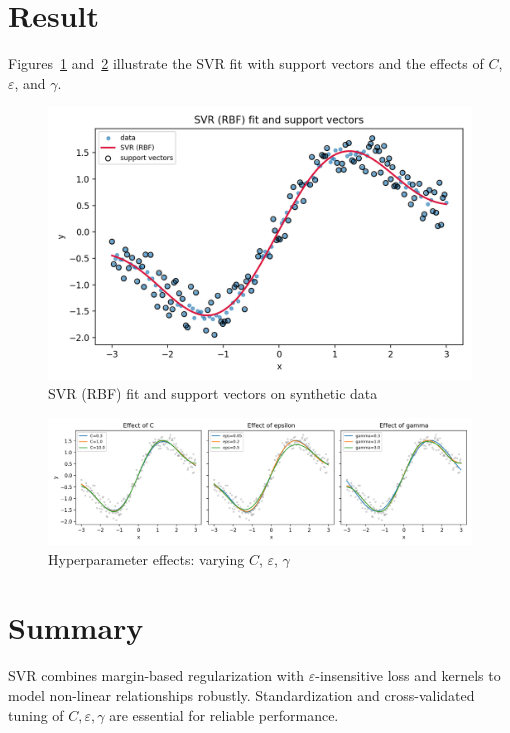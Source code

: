 \documentclass{article}
\begin{document}
\section{Result}
Figures~\ref{fig:svr_rbf_fit} and~\ref{fig:svr_params} illustrate the SVR fit with support vectors and the effects of \(C\), \(\varepsilon\), and \(\gamma\).

\begin{figure}[H]
  \centering
  \includegraphics[width=0.85\linewidth]{svr_rbf_fit.png}
  \caption{SVR (RBF) fit and support vectors on synthetic data}
  \label{fig:svr_rbf_fit}
\end{figure}

\begin{figure}[H]
  \centering
  \includegraphics[width=0.95\linewidth]{svr_params_effect.png}
  \caption{Hyperparameter effects: varying \(C\), \(\varepsilon\), \(\gamma\)}
  \label{fig:svr_params}
\end{figure}

\FloatBarrier

\section{Summary}
SVR combines margin-based regularization with \(\varepsilon\)-insensitive loss and kernels to model non-linear relationships robustly. Standardization and cross-validated tuning of \(C,\varepsilon,\gamma\) are essential for reliable performance.
\end{document}
